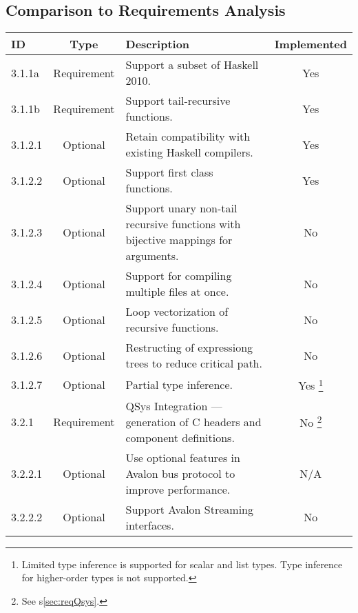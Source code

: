 \documentclass[english,onecolumn]{scrartcl}
\begin{document}
\subsection{Comparison to Requirements Analysis}
\begin{tabularx}{\textwidth}{l c X c}
\toprule
ID      & Type              & Description                 & Implemented
\\ \midrule

3.1.1a  & Requirement & Support a subset of Haskell 2010. & Yes
\\ \midrule

3.1.1b  & Requirement & Support tail-recursive functions. & Yes
\\ \midrule

3.1.2.1 & Optional    & Retain compatibility with existing Haskell compilers. & Yes
\\ \midrule

3.1.2.2 & Optional    & Support first class functions. & Yes
\\ \midrule

3.1.2.3 & Optional    & Support unary non-tail recursive functions with bijective mappings for arguments. & No
\\ \midrule

3.1.2.4 & Optional    & Support for compiling multiple files at once. & No
\\ \midrule

3.1.2.5 & Optional    & Loop vectorization of recursive functions. & No
\\ \midrule

3.1.2.6 & Optional    & Restructing of expressiong trees to reduce critical path. & No
\\ \midrule

3.1.2.7 & Optional    & Partial type inference. & Yes%
\footnote{Limited type inference is supported for scalar and list types. Type inference for higher-order types is not supported.}
\\ \midrule

3.2.1   & Requirement & QSys Integration --- generation of C headers and component definitions. & No%
\footnote{See s\ref{sec:reqQsys}.}
\\ \midrule

3.2.2.1 & Optional    & Use optional features in Avalon bus protocol to improve performance. & N/A
\\ \midrule

3.2.2.2 & Optional    & Support Avalon Streaming interfaces. & No
\\ \midrule


\end{tabularx}
\end{document}
